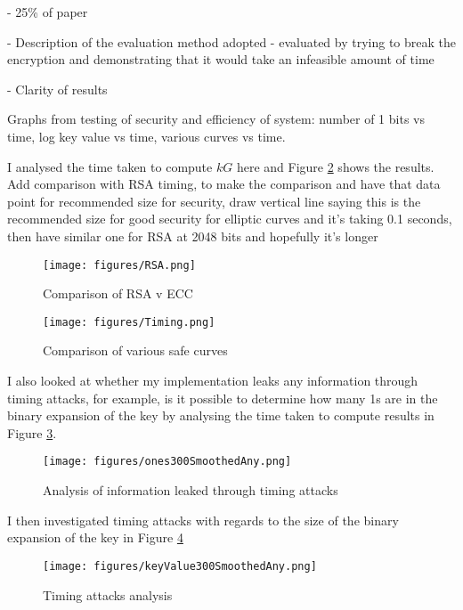 \documentclass[12pt,a4paper]{article}
\begin{document}
- 25\% of paper

- Description of the evaluation method adopted - evaluated by trying to break the encryption and demonstrating that it would take an infeasible amount of time

- Clarity of results


Graphs from testing of security and efficiency of system: number of 1 bits vs time, log key value vs time, various curves vs time.

I analysed the time taken to compute $kG$ here and Figure \ref{fig:curves} shows the results. 
Add comparison with RSA timing, to make the comparison and have that data point for recommended size for security, 
draw vertical line saying this is the recommended size for good security for elliptic curves and it's taking 0.1 seconds, 
then have similar one for RSA at 2048 bits and hopefully it's longer

\begin{figure}[htb]
    \centering
    \texttt{[image: figures/RSA.png]}
    \caption{Comparison of RSA v ECC}
    \label{fig:rsa}
\end{figure}


\begin{figure}[htb]
    \centering
    \texttt{[image: figures/Timing.png]}
    \caption{Comparison of various safe curves}
    \label{fig:curves}
\end{figure}

I also looked at whether my implementation leaks any information through timing attacks, 
for example, is it possible to determine how many 1s are in the binary expansion of the key by analysing the time taken to compute 
results in Figure \ref{fig:number1s}. 
\begin{figure}[htb]
    \centering
    \texttt{[image: figures/ones300SmoothedAny.png]}
    \caption{Analysis of information leaked through timing attacks}
    \label{fig:number1s}
\end{figure}

I then investigated timing attacks with regards to the size of the binary expansion of the key in Figure \ref{fig:logbase2}

\begin{figure}[htb]
    \centering
    \texttt{[image: figures/keyValue300SmoothedAny.png]}
    \caption{Timing attacks analysis}
    \label{fig:logbase2}
\end{figure}
\end{document}
